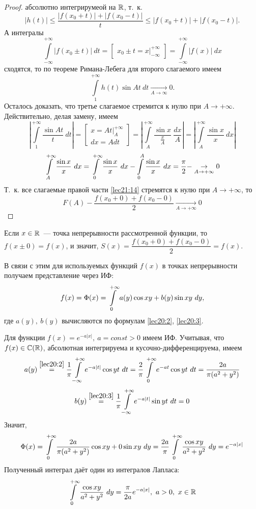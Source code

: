 \documentclass[../../main.tex]{subfiles}
\begin{document}
\begin{proof}
	абсолютно интегрирумеой на $ \mathbb{R} $, т.~к.
	\[
	|h(t)| \leq \dfrac{|f(x_0 + t)| + |f(x_0 - t)|}{t} \leq
	|f(x_0 + t)| + |f(x_0 - t)|.
	\]
	А интегралы 
	\[
	\int\limits_{-\infty}^{+\infty} |f(x_0 \pm t)|\ dt = 
	\begin{bmatrix}
	x_0 \pm t = x|_{-\infty}^{+\infty}
	\end{bmatrix} =
	\int\limits_{-\infty}^{+\infty} |f(x)|\ dx
	\] сходятся, то по теореме Римана-Лебега для второго слагаемого имеем
	\[
	\int\limits_{1}^{+\infty} h(t) \sin At\ dt
	\underset{A \to \infty}{\to} 0.
	\]
	Осталось доказать, что третье слагаемое 
	стремится к нулю при $ A \to +\infty $.\\
	Действительно, делая замену, имеем
	\[
	\left|
	\int\limits_{1}^{+\infty} \dfrac{\sin At}{t}\ dt
	\right| = \begin{bmatrix}
	x = At|_{A}^{+\infty} \\
	dx = Adt
	\end{bmatrix} = 
	\left|
	\int\limits_{A}^{+\infty} \dfrac{\sin x}{\frac{x}{A}}\ \dfrac{dx}{A}
	\right| = \left|
	\int\limits_{A}^{+\infty} \dfrac{\sin x}{x}\ dx
	\right|
	\]
	\[
	\int\limits_{A}^{+\infty} \dfrac{\sin x}{x}\ dx =
	\int\limits_{0}^{+\infty} \dfrac{\sin x}{x}\ dx - \int\limits_{0}^{A}
	\dfrac{\sin x}{x}\ dx = \dfrac{\pi}{2} -
	\underset{A \to +\infty}{\to} 0
	\]
	Т.~к. все слагаемые правой части \eqref{lec21:14} стремятся к нулю при
	$ A \to +\infty $, то
	\[
	F(A) - \dfrac{f(x_0 + 0) + f(x_0 - 0)}{2} 
	\underset{A \to +\infty}{\to} 0
	\]
\end{proof}
\begin{rem}
	Если $ x \in \mathbb{R} $~--- точка непрерывности рассмотренной функции, 
	то $ f(x \pm 0) = f(x) $, и значит, 
	$ S(x) = \dfrac{f(x_0 + 0) + f(x_0 - 0)}{2} = f(x) $.
\end{rem}
В связи с этим для используемых функций $ f(x) $ в точках непрерывности 
получаем представление через ИФ:
\[
f(x) = \Phi(x) = \int\limits_{0}^{+\infty}
a(y) \cos xy + b(y) \sin xy\ dy,
\] где $ a(y),\ b(y) $ вычисляются по формулам \eqref{lec20:2}, 
\eqref{lec20:3}.
\begin{exmp}
	Для функции $ f(x) = e^{-a|x|},\ a = const > 0 $ имеем ИФ. Учитывая, что
	$ f(x) \in \mathbb{C}(\mathbb{R}) $, абсолютная интегрируема и кусочно-дифференцируема, имеем
	\[
	a(y) \stackrel{\eqref{lec20:2}}{=}
	\dfrac{1}{\pi} \int\limits_{-\infty}^{+\infty}
	e^{-a|t|} \cos yt\ dt = \dfrac{2}{\pi}
	\int\limits_{0}^{+\infty} e^{-at} \cos yt\ dt =\dfrac{2a}{\pi(a^2 + y^2)}
	\] 
	\[
	b(y) \stackrel{\eqref{lec20:3}}{=}
	\dfrac{1}{\pi} \int\limits_{-\infty}^{+\infty}
	e^{-a|t|}\sin yt\ dt = 0
	\]
	Значит,
	\[
	\Phi(x) = \int\limits_{0}^{+\infty} \dfrac{2a}{\pi(a^2 + y^2)} \cos xy + 0 \sin xy\ dy =
	\dfrac{2a}{\pi} \int\limits_{0}^{+\infty} \dfrac{\cos xy}{a^2 + y^2}\ dy = e^{-a|x|}
	\]
	Полученный интеграл даёт один из интегралов Лапласа:
	\[
	\int\limits_{0}^{+\infty} \dfrac{\cos xy}{a^2 + y^2}\ dy =
	\dfrac{\pi}{2a} e^{-a|x|},\ a > 0,\ x \in \mathbb{R}
	\]
\end{exmp}
\end{document}
